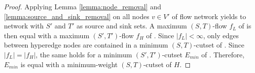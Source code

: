 \begin{proof}

Applying Lemma \ref{lemma:node_removal} and \ref{lemma:source_and_sink_removal}
on all nodes $v \in V'$ of flow network  yields to network
 with $S'$ and $T'$ as source and sink sets. A maximum
$(S,T)$-flow $f_L$ of  is then equal with a maximum $(S',T')$-flow $f_H$
of . Since $|f_L| < \infty$, only edges between hyperedge 
nodes are contained in a minimum $(S,T)$-cutset of . Since $|f_L| = |f_H|$, the same
holds for a minimum $(S',T')$-cutset $E_{min}$ of . Therefore, $E_{min}$
is equal with a minimum-weight $(S,T)$-cutset of $H$.

%

\end{proof}
